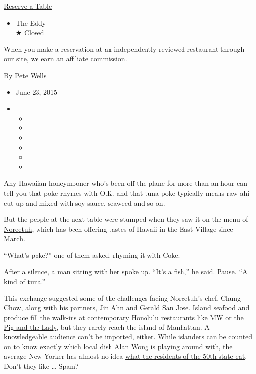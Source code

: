 \href{http://www.opentable.com/single.aspx?ref=4201\&rid=160957}{Reserve
a Table}

\begin{itemize}
\tightlist
\item
  The Eddy\\
  ★ Closed
\end{itemize}

When you make a reservation at an independently reviewed restaurant
through our site, we earn an affiliate commission.

By \href{http://www.nytimes3xbfgragh.onion/by/pete-wells}{Pete Wells}

\begin{itemize}
\item
  June 23, 2015
\item
  \begin{itemize}
  \item
  \item
  \item
  \item
  \item
  \item
  \end{itemize}
\end{itemize}

Any Hawaiian honeymooner who's been off the plane for more than an hour
can tell you that poke rhymes with O.K. and that tuna poke typically
means raw ahi cut up and mixed with soy sauce, seaweed and so on.

But the people at the next table were stumped when they saw it on the
menu of \href{http://www.noreetuh.com/}{Noreetuh}, which has been
offering tastes of Hawaii in the East Village since March.

``What's poke?'' one of them asked, rhyming it with Coke.

After a silence, a man sitting with her spoke up. ``It's a fish,'' he
said. Pause. ``A kind of tuna.''

This exchange suggested some of the challenges facing Noreetuh's chef,
Chung Chow, along with his partners, Jin Ahn and Gerald San Jose. Island
seafood and produce fill the walk-ins at contemporary Honolulu
restaurants like \href{http://mwrestaurant.com/}{MW} or
\href{http://thepigandthelady.com/}{the Pig and the Lady}, but they
rarely reach the island of Manhattan. A knowledgeable audience can't be
imported, either. While islanders can be counted on to know exactly
which local dish Alan Wong is playing around with, the average New
Yorker has almost no idea
\href{http://www.nytimes3xbfgragh.onion/2001/02/07/dining/en-route-hawaii-where-spam-ruled-a-cuisine-thrives.html}{what
the residents of the 50th state eat}. Don't they like \ldots{} Spam?

